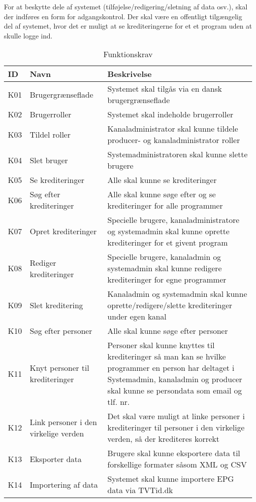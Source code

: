 For at beskytte dele af systemet (tilføjelse/redigering/sletning af data osv.), skal der indføres en form for adgangskontrol. Der skal være en offentligt tilgængelig del af systemet, hvor det er muligt at se krediteringerne for et et program uden at skulle logge ind.
\begin{table}
\centering
\begin{tabular}{ |p{1cm}|p{3.5cm}|p{7cm}| }
\hline
\textbf{ID} & \textbf{Navn} & \textbf{Beskrivelse} \\
\hline
K01 & Brugergrænseflade & Systemet skal tilgås via en dansk brugergrænseflade \\
\hline
K02 & Brugerroller & Systemet skal indeholde brugerroller \\
\hline
K03 & Tildel roller & Kanaladministrator skal kunne tildele producer- og kanaladministrator roller \\
\hline
K04 & Slet bruger & Systemadministratoren skal kunne slette brugere \\
\hline
K05 & Se krediteringer & Alle skal kunne se krediteringer \\
\hline
K06 & Søg efter krediteringer & Alle skal kunne søge efter og se krediteringer for alle programmer \\
\hline
K07 & Opret krediteringer & Specielle brugere, kanaladministratore og systemadmin skal kunne oprette
krediteringer for et givent program \\
\hline
K08 & Rediger krediteringer & Specielle brugere, kanaladmin og systemadmin skal kunne redigere krediteringer for egne programmer \\
\hline
K09 & Slet kreditering & Kanaladmin og systemadmin skal kunne oprette/redigere/slette krediteringer under egen kanal \\
\hline
K10 & Søg efter personer & Alle skal kunne søge efter personer \\
\hline
K11 & Knyt personer til krediteringer & Personer skal kunne knyttes til krediteringer så man kan se hvilke programmer en person har deltaget i Systemadmin, kanaladmin og producer skal kunne se persondata som email og tlf. nr. \\
\hline
K12 & Link personer i den virkelige verden & Det skal være muligt at linke personer i krediteringer til personer i den virkelige verden, så der krediteres korrekt \\
\hline
K13 & Eksporter data & Brugere skal kunne eksportere data til forskellige formater såsom XML og CSV \\
\hline
K14 & Importering af data & Systemet skal kunne importere EPG data via TVTid.dk \\
\hline
\end{tabular} 
\caption{Funktionskrav}
\label{table:1}
\end{table}

